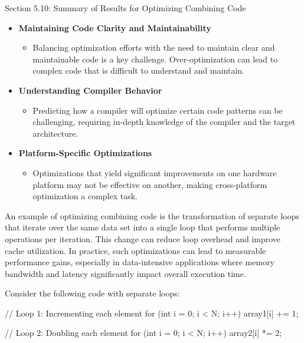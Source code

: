 \begin{notes}{Section 5.10: Summary of Results for Optimizing Combining Code}
    \begin{itemize}
        \item \textbf{Maintaining Code Clarity and Maintainability}
        \begin{itemize}
            \item Balancing optimization efforts with the need to maintain clear and maintainable code is a key challenge. Over-optimization can lead to complex code that is difficult to understand 
            and maintain.
        \end{itemize}
        \item \textbf{Understanding Compiler Behavior}
        \begin{itemize}
            \item Predicting how a compiler will optimize certain code patterns can be challenging, requiring in-depth knowledge of the compiler and the target architecture.
        \end{itemize}
        \item \textbf{Platform-Specific Optimizations}
        \begin{itemize}
            \item Optimizations that yield significant improvements on one hardware platform may not be effective on another, making cross-platform optimization a complex task.
        \end{itemize}
    \end{itemize}
    
    \begin{highlight}
        An example of optimizing combining code is the transformation of separate loops that iterate over the same data set into a single loop that performs multiple operations per iteration. This 
        change can reduce loop overhead and improve cache utilization. In practice, such optimizations can lead to measurable performance gains, especially in data-intensive applications where memory 
        bandwidth and latency significantly impact overall execution time.
    
        Consider the following code with separate loops:
    
    \begin{code}[C]
    // Loop 1: Incrementing each element
    for (int i = 0; i < N; i++) {
        array1[i] += 1;
    }
    
    // Loop 2: Doubling each element
    for (int i = 0; i < N; i++) {
        array2[i] *= 2;
    }
    \end{code}
    

\end{highlight}
\end{notes}
